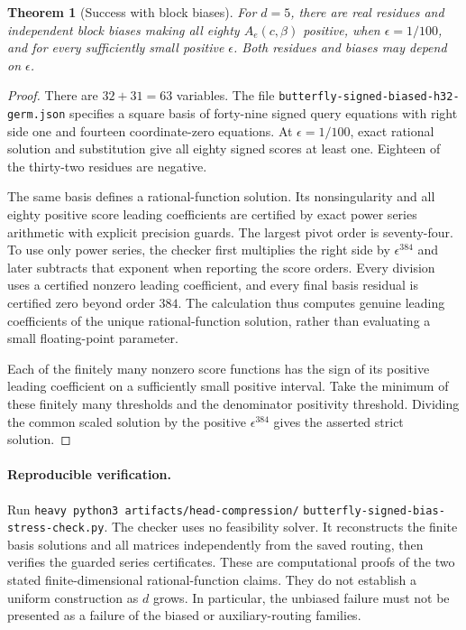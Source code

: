 \documentclass[11pt]{article}
\newtheorem{theorem}{Theorem}
\begin{document}
\begin{theorem}[Success with block biases]
For $d=5$, there are real residues and independent block biases making
all eighty $A_e(c,\beta)$ positive, when $\epsilon=1/100$, and for every
sufficiently small positive $\epsilon$. Both residues and biases may
depend on $\epsilon$.
\end{theorem}
\begin{proof}
There are $32+31=63$ variables. The file
\texttt{butterfly-signed-biased-h32-germ.json} specifies a square basis
of forty-nine signed query equations with right side one and fourteen
coordinate-zero equations. At $\epsilon=1/100$, exact rational solution
and substitution give all eighty signed scores at least one. Eighteen
of the thirty-two residues are negative.

The same basis defines a rational-function solution. Its nonsingularity
and all eighty positive score leading coefficients are certified by
exact power series arithmetic with explicit precision guards. The
largest pivot order is seventy-four. To use only power series, the
checker first multiplies the right side by $\epsilon^{384}$ and later
subtracts that exponent when reporting the score orders. Every division
uses a certified nonzero leading coefficient, and every final basis
residual is certified zero beyond order $384$. The calculation thus
computes genuine leading coefficients of the unique rational-function
solution, rather than evaluating a small floating-point parameter.

Each of the finitely many nonzero score functions has the sign of its
positive leading coefficient on a sufficiently small positive interval.
Take the minimum of these finitely many thresholds and the denominator
positivity threshold. Dividing the common scaled solution by the
positive $\epsilon^{384}$ gives the asserted strict solution.
\end{proof}

\paragraph{Reproducible verification.}
Run \texttt{heavy python3 artifacts/head-compression/}
\texttt{butterfly-signed-bias-stress-check.py}. The checker uses no
feasibility solver. It reconstructs the finite basis solutions and all
matrices independently from the saved routing, then verifies the guarded
series certificates. These are computational proofs of the two stated
finite-dimensional rational-function claims. They do not establish a
uniform construction as $d$ grows. In particular, the unbiased failure
must not be presented as a failure of the biased or auxiliary-routing
families.
\end{document}
